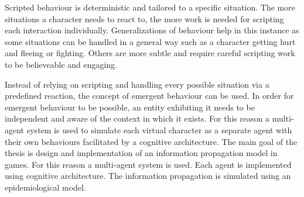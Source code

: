 Scripted behaviour is deterministic and tailored to a specific situation.
The more situations a character needs to react to, the more work is needed for scripting each interaction individually.
Generalizations of behaviour help in this instance as some situations can be handled in a general way such as a character getting hurt and fleeing or fighting.
Others are more subtle and require careful scripting work to be believeable and engaging.

Instead of relying on scripting and handling every possible situation via a predefined reaction, the concept of emergent behaviour can be used.
In order for emergent behaviour to be possible, an entity exhibiting it needs to be independent and aware of the context in which it exists.
For this reason a multi-agent system is used to simulate each virtual character as a separate agent with their own behaviours facilitated by a cognitive architecture.
The main goal of the thesis is design and implementation of an information propagation model in games.
For this reason a multi-agent system is used.
Each agent is implemented using cognitive architecture.
The information propagation is simulated using an epidemiological model.



